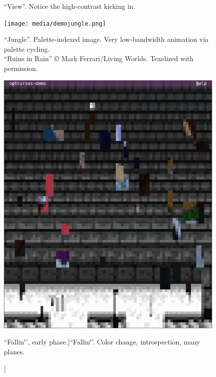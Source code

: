 \documentclass[letterpaper,10pt]{article}
\begin{document}
\begin{figure}
\begin{minipage}{0.45\textwidth}
    \caption{``View''. Notice the high-contrast kicking in.}
  \end{minipage}\hfill
\end{figure}

\begin{figure}
  \centering \texttt{[image: media/demojungle.png]}
  \caption[``Jungle''. Palette-indexed image.]{``Jungle''. Palette-indexed image. Very low-bandwidth animation via palette cycling.\\
    ``Ruins in Rain'' © Mark Ferrari/Living Worlds. Texelized with permission.}
\end{figure}


\begin{figure}
  \centering
  \begin{minipage}{0.45\textwidth}
    \includegraphics[width=1\linewidth]{media/demo-fallin1.png}
    \caption[``Fallin\''', early phase.]{``Fallin\'''. Color change, introspection, many planes.}
  \end{minipage}\hfill
  \begin{minipage}{0.45\textwidth}

\end{minipage}
\end{figure}
\end{document}
